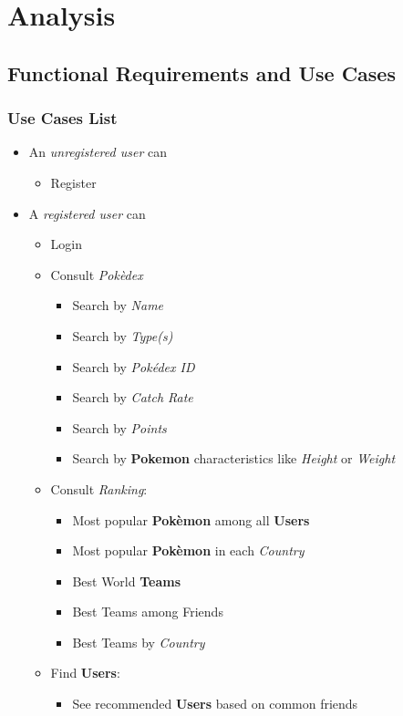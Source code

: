\section{Analysis}
\subsection{Functional Requirements and Use Cases}
\subsubsection{Use Cases List}
\begin{itemize}
	\item An \textit{unregistered user} can
	\begin{itemize}
		\item Register
	\end{itemize}
	\item A \textit{registered user} can
	\begin{itemize}
		\item Login
		\item Consult \textit{Pokèdex}
		\begin{itemize}
			\item Search by \textit{Name}
			\item Search by \textit{Type(s)}
			\item Search by \textit{Pokédex ID}
			\item Search by \textit{Catch Rate}
			\item Search by \textit{Points}  
			\item Search by \textbf{Pokemon} characteristics like \textit{Height} or \textit{Weight}
		\end{itemize}
		\item Consult \textit{Ranking}:
		\begin{itemize}
			\item Most popular \textbf{Pokèmon} among all \textbf{Users}
			\item Most popular \textbf{Pokèmon} in each \textit{Country}
			\item Best World \textbf{Teams}
			\item Best Teams among Friends
			\item Best Teams by \textit{Country}
		\end{itemize}
		\item Find \textbf{Users}:
		\begin{itemize}
			\item See recommended \textbf{Users} based on common friends

\end{itemize}
\end{itemize}
\end{itemize}
